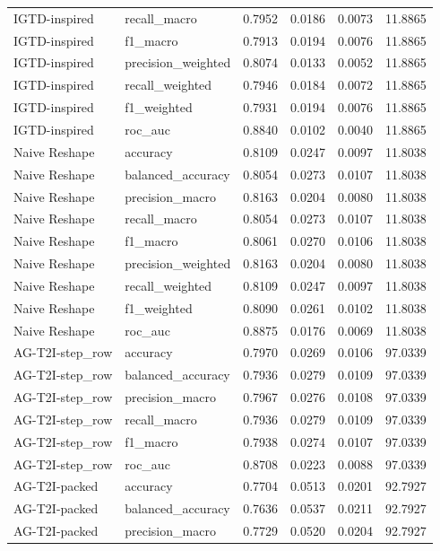 \begin{tabular}{llrrrr}
IGTD-inspired & recall_macro & 0.7952 & 0.0186 & 0.0073 & 11.8865 \\
IGTD-inspired & f1_macro & 0.7913 & 0.0194 & 0.0076 & 11.8865 \\
IGTD-inspired & precision_weighted & 0.8074 & 0.0133 & 0.0052 & 11.8865 \\
IGTD-inspired & recall_weighted & 0.7946 & 0.0184 & 0.0072 & 11.8865 \\
IGTD-inspired & f1_weighted & 0.7931 & 0.0194 & 0.0076 & 11.8865 \\
IGTD-inspired & roc_auc & 0.8840 & 0.0102 & 0.0040 & 11.8865 \\
Naive Reshape & accuracy & 0.8109 & 0.0247 & 0.0097 & 11.8038 \\
Naive Reshape & balanced_accuracy & 0.8054 & 0.0273 & 0.0107 & 11.8038 \\
Naive Reshape & precision_macro & 0.8163 & 0.0204 & 0.0080 & 11.8038 \\
Naive Reshape & recall_macro & 0.8054 & 0.0273 & 0.0107 & 11.8038 \\
Naive Reshape & f1_macro & 0.8061 & 0.0270 & 0.0106 & 11.8038 \\
Naive Reshape & precision_weighted & 0.8163 & 0.0204 & 0.0080 & 11.8038 \\
Naive Reshape & recall_weighted & 0.8109 & 0.0247 & 0.0097 & 11.8038 \\
Naive Reshape & f1_weighted & 0.8090 & 0.0261 & 0.0102 & 11.8038 \\
Naive Reshape & roc_auc & 0.8875 & 0.0176 & 0.0069 & 11.8038 \\
AG-T2I-step_row & accuracy & 0.7970 & 0.0269 & 0.0106 & 97.0339 \\
AG-T2I-step_row & balanced_accuracy & 0.7936 & 0.0279 & 0.0109 & 97.0339 \\
AG-T2I-step_row & precision_macro & 0.7967 & 0.0276 & 0.0108 & 97.0339 \\
AG-T2I-step_row & recall_macro & 0.7936 & 0.0279 & 0.0109 & 97.0339 \\
AG-T2I-step_row & f1_macro & 0.7938 & 0.0274 & 0.0107 & 97.0339 \\
AG-T2I-step_row & roc_auc & 0.8708 & 0.0223 & 0.0088 & 97.0339 \\
AG-T2I-packed & accuracy & 0.7704 & 0.0513 & 0.0201 & 92.7927 \\
AG-T2I-packed & balanced_accuracy & 0.7636 & 0.0537 & 0.0211 & 92.7927 \\
AG-T2I-packed & precision_macro & 0.7729 & 0.0520 & 0.0204 & 92.7927 \\

\end{tabular}
